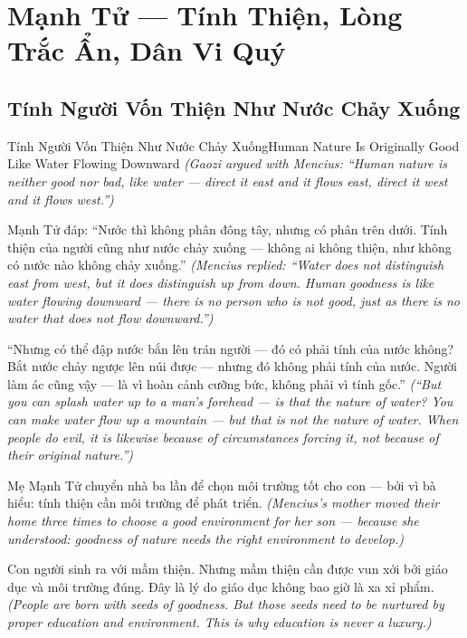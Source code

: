 \chapter{Mạnh Tử — Tính Thiện, Lòng Trắc Ẩn, Dân Vi Quý}

\section{Tính Người Vốn Thiện Như Nước Chảy Xuống}
\begin{truyen}{Tính Người Vốn Thiện Như Nước Chảy Xuống}{Human Nature Is Originally Good Like Water Flowing Downward}
\textit{(Gaozi argued with Mencius: ``Human nature is neither good nor bad, like water — direct it east and it flows east, direct it west and it flows west.'')}

Mạnh Tử đáp: ``Nước thì không phân đông tây, nhưng có phân trên dưới. Tính thiện của người cũng như nước chảy xuống — không ai không thiện, như không có nước nào không chảy xuống.''
\textit{(Mencius replied: ``Water does not distinguish east from west, but it does distinguish up from down. Human goodness is like water flowing downward — there is no person who is not good, just as there is no water that does not flow downward.'')}

``Nhưng có thể đập nước bắn lên trán người — đó có phải tính của nước không? Bắt nước chảy ngược lên núi được — nhưng đó không phải tính của nước. Người làm ác cũng vậy — là vì hoàn cảnh cưỡng bức, không phải vì tính gốc.''
\textit{(``But you can splash water up to a man's forehead — is that the nature of water? You can make water flow up a mountain — but that is not the nature of water. When people do evil, it is likewise because of circumstances forcing it, not because of their original nature.'')}

Mẹ Mạnh Tử chuyển nhà ba lần để chọn môi trường tốt cho con — bởi vì bà hiểu: tính thiện cần môi trường để phát triển.
\textit{(Mencius's mother moved their home three times to choose a good environment for her son — because she understood: goodness of nature needs the right environment to develop.)}

\end{truyen}

\begin{baihoc}
Con người sinh ra với mầm thiện. Nhưng mầm thiện cần được vun xới bởi giáo dục và môi trường đúng. Đây là lý do giáo dục không bao giờ là xa xỉ phẩm.
\textit{(People are born with seeds of goodness. But those seeds need to be nurtured by proper education and environment. This is why education is never a luxury.)}
\end{baihoc}
\ngancach

